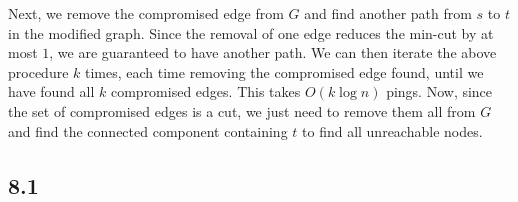\documentclass{article}
\begin{document}
Next, we remove the compromised edge from $G$ and find another path from $s$ to $t$ in the modified graph. Since the removal of one edge reduces the min-cut by at most $1$, we are guaranteed to have another path. We can then iterate the above procedure $k$ times, each time removing the compromised edge found, until we have found all $k$ compromised edges. This takes $O(k\log n)$ pings. Now, since the set of compromised edges is a cut, we just need to remove them all from $G$ and find the connected component containing $t$ to find all unreachable nodes.
\subsection*{8.1}
\end{document}
